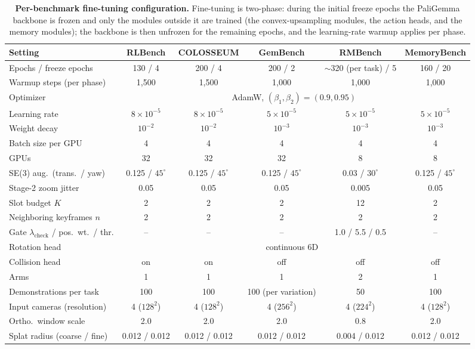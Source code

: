 \begin{table}[t]
\centering
\caption{\textbf{Per-benchmark fine-tuning configuration.}
Fine-tuning is two-phase: during the initial freeze epochs the
PaliGemma backbone is frozen and only the modules outside it are
trained (the convex-upsampling modules, the action heads, and the
memory modules); the backbone is then unfrozen for the remaining
epochs, and the learning-rate warmup applies per phase.}
\label{tab:hyperparams}
\footnotesize
\setlength{\tabcolsep}{6pt}
\setlength{\aboverulesep}{0pt}
\setlength{\belowrulesep}{0pt}
\renewcommand{\arraystretch}{1.2}
\begin{tabular}{lccccc}
\toprule
\textbf{Setting} & \textbf{RLBench} & \textbf{COLOSSEUM} & \textbf{GemBench} & \textbf{RMBench} & \textbf{MemoryBench} \\
\midrule
Epochs / freeze epochs & 130 / 4 & 200 / 4 & 200 / 2 & $\sim$320 (per task) / 5 & 160 / 20 \\
Warmup steps (per phase) & 1,500 & 1,500 & 1,000 & 1,000 & 1,000 \\
Optimizer & \multicolumn{5}{c}{AdamW, $(\beta_1, \beta_2) = (0.9, 0.95)$} \\
Learning rate & $8{\times}10^{-5}$ & $8{\times}10^{-5}$ & $5{\times}10^{-5}$ & $5{\times}10^{-5}$ & $5{\times}10^{-5}$ \\
Weight decay & $10^{-2}$ & $10^{-2}$ & $10^{-3}$ & $10^{-3}$ & $10^{-3}$ \\
Batch size per GPU & 4 & 4 & 4 & 4 & 4 \\
GPUs & 32 & 32 & 32 & 8 & 8 \\
\midrule
SE(3) aug.\ (trans.\ / yaw) & 0.125 / $45^{\circ}$ & 0.125 / $45^{\circ}$ & 0.125 / $45^{\circ}$ & 0.03 / $30^{\circ}$ & 0.125 / $45^{\circ}$ \\
Stage-2 zoom jitter & 0.05 & 0.05 & 0.05 & 0.005 & 0.05 \\
\midrule
Slot budget $K$ & 2 & 2 & 2 & 12 & 2 \\
Neighboring keyframes $n$ & 2 & 2 & 2 & 2 & 2 \\
Gate $\lambda_{\mathrm{check}}$ / pos.\ wt.\ / thr. & -- & -- & -- & 1.0 / 5.5 / 0.5 & -- \\
\midrule
Rotation head & \multicolumn{5}{c}{continuous 6D~\cite{zhou2019continuity}} \\
Collision head & on & on & off & off & off \\
Arms & 1 & 1 & 1 & 2 & 1 \\
Demonstrations per task & 100 & 100 & 100 (per variation) & 50 & 100 \\
\midrule
Input cameras (resolution) & 4 ($128^2$) & 4 ($128^2$) & 4 ($256^2$) & 4 ($224^2$) & 4 ($128^2$) \\
Ortho.\ window scale & 2.0 & 2.0 & 2.0 & 0.8 & 2.0 \\
Splat radius (coarse / fine) & 0.012 / 0.012 & 0.012 / 0.012 & 0.012 / 0.012 & 0.004 / 0.012 & 0.012 / 0.012 \\
\bottomrule
\end{tabular}
\end{table}

